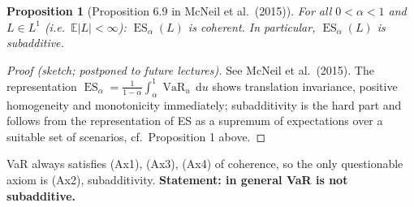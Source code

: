 \documentclass[11pt,a4paper]{article}
\newtheorem{proposition}{Proposition}
\newcommand{\VaR}{\operatorname{VaR}}
\newcommand{\ES}{\operatorname{ES}}
\newcommand{\E}{\mathbb{E}}
\newcommand{\dd}{\,\mathrm{d}}
\begin{document}
\begin{proposition}[Proposition 6.9 in McNeil et al.\ (2015)]
For all $0<\alpha<1$ and $L\in L^1$ (i.e.\ $\E|L|<\infty$): $\ES_\alpha(L)$ is coherent. In
particular, $\ES_\alpha(L)$ is subadditive.
\end{proposition}
\begin{proof}[Proof (sketch; postponed to future lectures)]
See McNeil et al.\ (2015). The representation $\ES_\alpha=\frac{1}{1-\alpha}\int_\alpha^1\VaR_u\dd u$
shows translation invariance, positive homogeneity and monotonicity immediately; subadditivity is the
hard part and follows from the representation of ES as a supremum of expectations over a suitable set
of scenarios, cf.\ Proposition 1 above.
\end{proof}

VaR always satisfies (Ax1), (Ax3), (Ax4) of coherence, so the only questionable axiom is (Ax2),
subadditivity. \textbf{Statement: in general VaR is not subadditive.}
\end{document}
